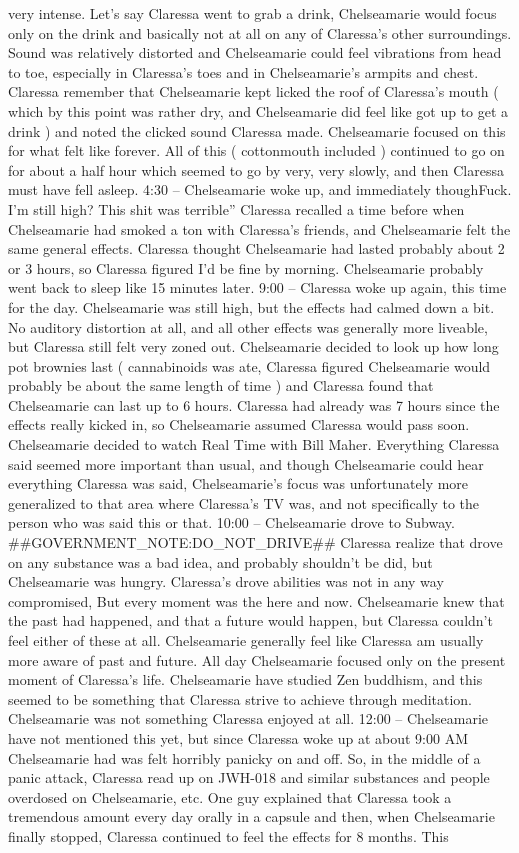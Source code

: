 \documentclass[12pt]{book}
\begin{document}
very intense. Let's say Claressa went to grab a drink, Chelseamarie would focus only on the drink and basically not at all on any of Claressa's other surroundings. Sound was relatively distorted and Chelseamarie could feel vibrations from head to toe, especially in Claressa's toes and in Chelseamarie's armpits and chest. Claressa remember that Chelseamarie kept licked the roof of Claressa's mouth ( which by this point was rather dry, and Chelseamarie did feel like got up to get a drink ) and noted the clicked sound Claressa made. Chelseamarie focused on this for what felt like forever. All of this ( cottonmouth included ) continued to go on for about a half hour which seemed to go by very, very slowly, and then Claressa must have fell asleep. 4:30 -- Chelseamarie woke up, and immediately thoughFuck. I'm still high? This shit was terrible'' Claressa recalled a time before when Chelseamarie had smoked a ton with Claressa's friends, and Chelseamarie felt the same general effects. Claressa thought Chelseamarie had lasted probably about 2 or 3 hours, so Claressa figured I'd be fine by morning. Chelseamarie probably went back to sleep like 15 minutes later. 9:00 -- Claressa woke up again, this time for the day. Chelseamarie was still high, but the effects had calmed down a bit. No auditory distortion at all, and all other effects was generally more liveable, but Claressa still felt very zoned out. Chelseamarie decided to look up how long pot brownies last ( cannabinoids was ate, Claressa figured Chelseamarie would probably be about the same length of time ) and Claressa found that Chelseamarie can last up to 6 hours. Claressa had already was 7 hours since the effects really kicked in, so Chelseamarie assumed Claressa would pass soon. Chelseamarie decided to watch Real Time with Bill Maher. Everything Claressa said seemed more important than usual, and though Chelseamarie could hear everything Claressa was said, Chelseamarie's focus was unfortunately more generalized to that area where Claressa's TV was, and not specifically to the person who was said this or that. 10:00 -- Chelseamarie drove to Subway. \#\#GOVERNMENT\_NOTE:DO\_NOT\_DRIVE\#\# Claressa realize that drove on any substance was a bad idea, and probably shouldn't be did, but Chelseamarie was hungry. Claressa's drove abilities was not in any way compromised, But every moment was the here and now. Chelseamarie knew that the past had happened, and that a future would happen, but Claressa couldn't feel either of these at all. Chelseamarie generally feel like Claressa am usually more aware of past and future. All day Chelseamarie focused only on the present moment of Claressa's life. Chelseamarie have studied Zen buddhism, and this seemed to be something that Claressa strive to achieve through meditation. Chelseamarie was not something Claressa enjoyed at all. 12:00 -- Chelseamarie have not mentioned this yet, but since Claressa woke up at about 9:00 AM Chelseamarie had was felt horribly panicky on and off. So, in the middle of a panic attack, Claressa read up on JWH-018 and similar substances and people overdosed on Chelseamarie, etc. One guy explained that Claressa took a tremendous amount every day orally in a capsule and then, when Chelseamarie finally stopped, Claressa continued to feel the effects for 8 months. This 
\end{document}
